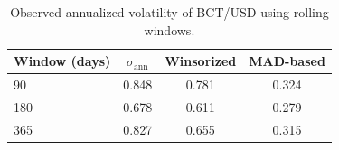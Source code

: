 \begin{table}[t]
\centering
\footnotesize
\caption{Observed annualized volatility of BCT/USD using rolling windows.}
\label{tab:validation_vol}
\begin{tabular}{l c c c}
\hline
Window (days) & $\sigma_{\text{ann}}$ & Winsorized & MAD-based \\
\hline
90 & 0.848 & 0.781 & 0.324 \\
180 & 0.678 & 0.611 & 0.279 \\
365 & 0.827 & 0.655 & 0.315 \\
\hline
\end{tabular}
\end{table}
